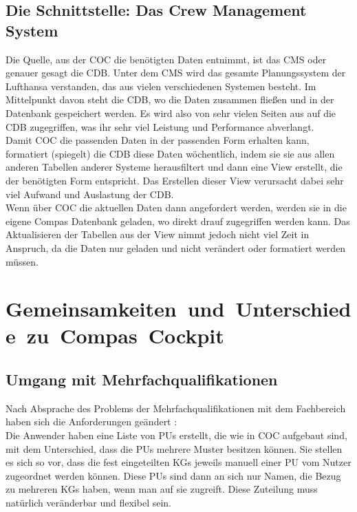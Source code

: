 \documentclass [12pt, a4paper, oneside, titlepage, ngerman]{article}
\begin{document}
\subsection {Die Schnittstelle: Das Crew Management System}
Die Quelle, aus der \ac{COC} die benötigten Daten entnimmt, ist das \ac{CMS} oder genauer gesagt die \ac{CDB}. Unter dem \ac{CMS} wird das gesamte Planungssystem der Lufthansa verstanden, das aus vielen verschiedenen Systemen besteht. Im Mittelpunkt davon steht die \ac{CDB}, wo die Daten zusammen fließen und in der Datenbank gespeichert werden. Es wird also von sehr vielen Seiten aus auf die \ac{CDB} zugegriffen, was ihr sehr viel Leistung und Performance abverlangt. \\
Damit \ac{COC} die passenden Daten in der passenden Form erhalten kann, formatiert (spiegelt) die \ac{CDB} diese Daten wöchentlich, indem sie sie aus allen anderen Tabellen anderer Systeme herausfiltert und dann eine View erstellt, die der benötigten Form entspricht. Das Erstellen dieser View verursacht dabei sehr viel Aufwand und Auslastung der \ac{CDB}.\\
Wenn über \ac{COC} die aktuellen Daten dann angefordert werden, werden sie in die eigene Compas Datenbank geladen, wo direkt drauf zugegriffen werden kann. Das Aktualisieren der Tabellen aus der View nimmt jedoch nicht viel Zeit in Anspruch, da die Daten nur geladen und nicht verändert oder formatiert werden müssen.



\section{\mbox{Gemeinsamkeiten und Unterschiede zu Compas Cockpit}}
\subsection{Umgang mit Mehrfachqualifikationen}
Nach Absprache des Problems der Mehrfachqualifikationen mit dem Fachbereich haben sich die Anforderungen geändert \cite[vgl.][]{Gespraech4}: \\
Die Anwender haben eine Liste von \acp{PU} erstellt, die wie in \ac{COC} aufgebaut sind, mit dem Unterschied, dass die \acp{PU} mehrere Muster besitzen können. Sie stellen es sich so vor, dass die fest eingeteilten \acp{KG} jeweils manuell einer \ac{PU} vom Nutzer zugeordnet werden können. Diese \acp{PU} sind dann an sich nur Namen, die Bezug zu mehreren \acp{KG} haben, wenn man auf sie zugreift. Diese Zuteilung muss natürlich veränderbar und flexibel sein.
\end{document}
